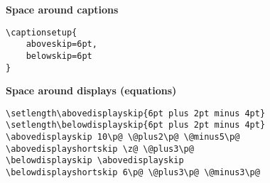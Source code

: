 \textbf{Space around captions}

\begin{lstlisting}[style=kaolstplain]
\captionsetup{
	aboveskip=6pt,
	belowskip=6pt
}
\end{lstlisting}

\textbf{Space around displays (\eg equations)}

\begin{lstlisting}[style=kaolstplain]
\setlength\abovedisplayskip{6pt plus 2pt minus 4pt}
\setlength\belowdisplayskip{6pt plus 2pt minus 4pt}
\abovedisplayskip 10\p@ \@plus2\p@ \@minus5\p@
\abovedisplayshortskip \z@ \@plus3\p@
\belowdisplayskip \abovedisplayskip
\belowdisplayshortskip 6\p@ \@plus3\p@ \@minus3\p@
\end{lstlisting}
